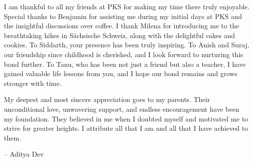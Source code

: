 I am thankful to all my friends at PKS for making my time there truly enjoyable. Special thanks to Benjamin for assisting me during my initial days at PKS and the insightful discussions over coffee. I thank Milena for introducing me to the breathtaking hikes in Sächsische Schweiz, along with the delightful cakes and cookies. To Siddarth, your presence has been truly inspiring. To Anish and Suraj, our friendship since childhood is cherished, and I look forward to nurturing this bond further. To Tanu, who has been not just a friend but also a teacher, I have gained valuable life lessons from you, and I hope our bond remains and grows stronger with time.

My deepest and most sincere appreciation goes to my parents. Their unconditional love, unwavering support, and endless encouragement have been my foundation. They believed in me when I doubted myself and motivated me to strive for greater heights. I attribute all that I am and all that I have achieved to them. 


\vspace{1cm}

\hfill -- Aditya Dev

\newpage